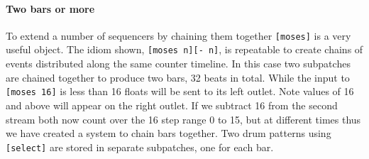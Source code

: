 \paragraph{Two bars or more}
To extend a number of sequencers by chaining them together \verb+[moses]+ is a very useful
object. The idiom shown, \verb+[moses n]+\verb+[- n]+, is repeatable to create chains of
events distributed along the same counter timeline. In this case two subpatches are chained together to produce two bars,
32 beats in total. While the input to \verb+[moses 16]+ is less than 16 floats will
be sent to its left outlet. Note values of 16 and above will appear on the right outlet.
If we subtract 16 from the second stream both now count over the 16 step range 0 to 15,
but at different times thus we have created a system to chain bars together. 
Two drum patterns using \verb+[select]+ are stored in separate subpatches, one for each bar. 